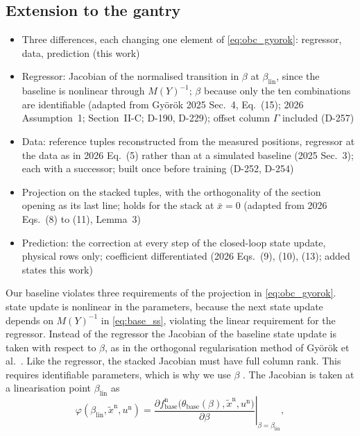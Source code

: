 \subsection{Extension to the gantry}\label{sec:obc_map}
\ifdraft
\begin{itemize}
\item Three differences, each changing one element of \eqref{eq:obc_gyorok}: regressor, data, prediction (this work)
\item Regressor: Jacobian of the normalised transition in $\beta$ at $\beta_{\mathrm{lin}}$, since the baseline is nonlinear through $M(Y)^{-1}$; $\beta$ because only the ten combinations are identifiable (adapted from Gy\"or\"ok 2025 Sec.~4, Eq.~(15); 2026 Assumption~1; Section~II-C; D-190, D-229); offset column $\Gamma$ included (D-257)
\item Data: reference tuples reconstructed from the measured positions, regressor at the data as in 2026 Eq.~(5) rather than at a simulated baseline (2025 Sec.~3); each with a successor; built once before training (D-252, D-254)
\item Projection on the stacked tuples, with the orthogonality of the section opening as its last line; holds for the stack at $\bar x=0$ (adapted from 2026 Eqs.~(8) to (11), Lemma~3)
\item Prediction: the correction at every step of the closed-loop state update, physical rows only; coefficient differentiated (2026 Eqs.~(9), (10), (13); added states this work)
\end{itemize}
\fi
Our baseline violates three requirements of the projection in
\eqref{eq:obc_gyorok}.
 state update is nonlinear in the parameters, because
the next state update depends on $M(Y)^{-1}$ in \eqref{eq:base_ss},
violating the linear requirement for the regressor.
Instead of the regressor the Jacobian of the baseline state update is taken 
with respect to $\beta$,
as in the orthogonal regularisation method of
Gy\"or\"ok et al.~\cite[Sec.~4, Eq.~(15)]{gyorok2025l4dc}.
Like the regressor, the stacked Jacobian must have full column rank.
This requires identifiable parameters, which is why we use $\beta$ .
The Jacobian is taken at a linearisation point $\beta_{\mathrm{lin}}$ as
\begin{equation}
 \varphi(\beta_{\mathrm{lin}},\tilde x^{\mathrm n},u^{\mathrm n})
 =\left.\frac{\partial f^{\mathrm n}_{\mathrm{base}}\bigl(\theta_{\mathrm{base}}(\beta),\tilde x^{\mathrm n},u^{\mathrm n}\bigr)}
   {\partial\beta}\right|_{\beta=\beta_{\mathrm{lin}}},
\label{eq:obc_sens}
\end{equation}
